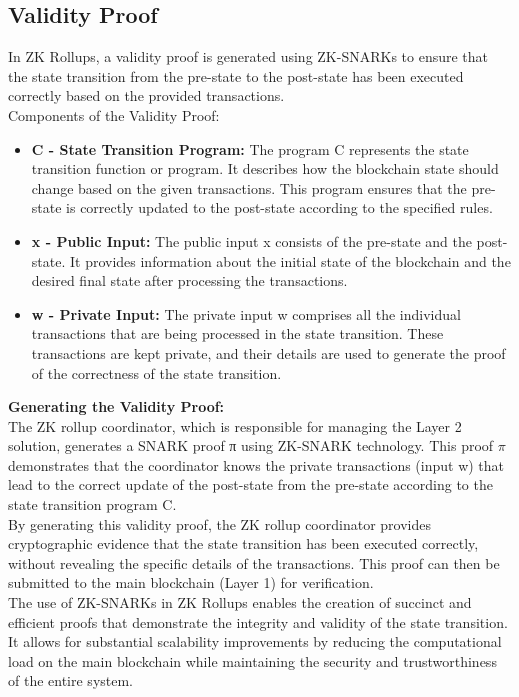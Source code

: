\subsection{Validity Proof}
In ZK Rollups, a validity proof is generated using ZK-SNARKs to ensure that the state transition from the pre-state to the post-state has been executed correctly based on the provided transactions.\\
Components of the Validity Proof:\\
\begin{itemize}
	\item \textbf{C - State Transition Program:} The program C represents the state transition function or program. It describes how the blockchain state should change based on the given transactions. This program ensures that the pre-state is correctly updated to the post-state according to the specified rules.
	\item \textbf{x - Public Input:} The public input x consists of the pre-state and the post-state. It provides information about the initial state of the blockchain and the desired final state after processing the transactions.
	\item \textbf{w - Private Input:} The private input w comprises all the individual transactions that are being processed in the state transition. These transactions are kept private, and their details are used to generate the proof of the correctness of the state transition.
\end{itemize}
\textbf{Generating the Validity Proof:}\\
The ZK rollup coordinator, which is responsible for managing the Layer 2 solution, generates a SNARK proof π using ZK-SNARK technology. This proof $\pi$ demonstrates that the coordinator knows the private transactions (input w) that lead to the correct update of the post-state from the pre-state according to the state transition program C.\\
By generating this validity proof, the ZK rollup coordinator provides cryptographic evidence that the state transition has been executed correctly, without revealing the specific details of the transactions. This proof can then be submitted to the main blockchain (Layer 1) for verification.\\
The use of ZK-SNARKs in ZK Rollups enables the creation of succinct and efficient proofs that demonstrate the integrity and validity of the state transition. It allows for substantial scalability improvements by reducing the computational load on the main blockchain while maintaining the security and trustworthiness of the entire system.
